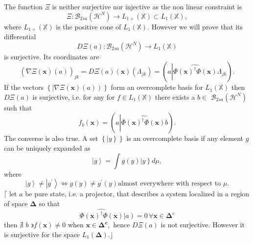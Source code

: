 \documentclass[aps,preprint]{revtex4}%
\begin{document}
The function $\Xi$ is neither surjective nor injective as the non linear
constraint is
\begin{equation}
\Xi:\mathcal{B}_{2sa}\left(  \mathcal{H}^{N}\right)  \rightarrow L_{1+}\left(
\mathbb{X}\right)  \subset L_{1}\left(  \mathbb{X}\right)  ,
\end{equation}
where $L_{1+}\left(  \mathbb{X}\right)  $ is the positive cone of
$L_{1}\left(  \mathbb{X}\right)  .$ However we will prove that its
differential
\begin{equation}
D\Xi\left(  a\right)  :\mathcal{B}_{2sa}\left(  \mathcal{H}^{N}\right)
\rightarrow L_{1}\left(  \mathbb{X}\right)
\end{equation}
is surjective. Its coordinates are
\begin{equation}
\left(  \overset{}{\nabla\Xi\left(  \mathbf{x}\right)  \left(  a\right)
}\right)  _{jk}=D\Xi\left(  a\right)  \left(  \mathbf{x}\right)  \left(
\Lambda_{jk}\right)  =\left(  a\left\vert \widehat{\Phi\left(  \mathbf{x}%
\right)  ^{\dagger}\Phi\left(  \mathbf{x}\right)  }\right.  \Lambda
_{jk}\right)  .
\end{equation}
If the vectors $\left\{  \left\vert \nabla\Xi\left(  \mathbf{x}\right)
\left(  a\right)  \right)  \right\}  $ form an overcomplete basis for
$L_{1}\left(  \mathbb{X}\right)  $ then $D\Xi\left(  a\right)  $ is
surjective, i.e. for any for $f\in L_{1}\left(  \mathbb{X}\right)  $ there
exists a $b\in$ $\mathcal{B}_{2sa}\left(  \mathcal{H}^{N}\right)  $ such that
\begin{equation}
f_{b}\left(  \mathbf{x}\right)  =\left(  a\left\vert \widehat{\Phi\left(
\mathbf{x}\right)  ^{\dagger}\Phi\left(  \mathbf{x}\right)  }\right.
b\right)  \mathbf{.}%
\end{equation}
The converse is also true. A set $\left\{  \left\vert y\right\}  \right\}  $
is an overcomplete basis if any element $g$ can be uniquely expanded as
\begin{equation}
\left\vert g\right\rangle =\int g\left(  y\right)  \left\vert y\right\}  d\mu,
\end{equation}
where
\begin{equation}
\left\vert g\right\rangle \neq\left\vert g^{\prime}\right\rangle
\Leftrightarrow g\left(  y\right)  \neq g^{\prime}\left(  y\right)  \text{
almost everywhere with respect to }\mu.
\end{equation}
$\lceil$ let $a$ be pure state, i.e. a projector, that describes a system
localized in a region of space $\mathbf{\Delta}$ so that
\begin{equation}
\widehat{\Phi\left(  \mathbf{x}\right)  ^{\dagger}\Phi\left(  \mathbf{x}%
\right)  }\left\vert \overset{}{a}\right)  =0\,\forall\mathbf{x\in\Delta}^{c}%
\end{equation}
then $\nexists$ $b$ $\backepsilon f\left(  \mathbf{x}\right)  \neq0$ when
$\mathbf{x\in\mathbf{\Delta}^{c},}$ hence $D\Xi\left(  a\right)  $ is not
surjective. However it is surjective for the space $L_{1}\left(
\mathbf{\Delta}\right)  .\mathbf{\rfloor}$
\end{document}
